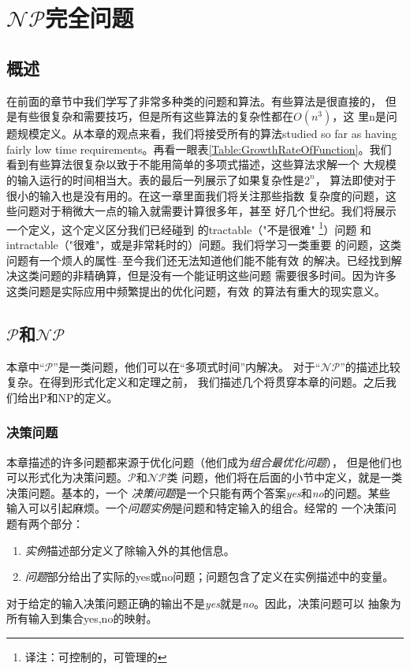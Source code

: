 \chapter{$\mathcal {NP}$完全问题}\label{Sec:Chapter:NPCompleteProblem}
\section{概述}
在前面的章节中我们学写了非常多种类的问题和算法。有些算法是很直接的，
但是有些很复杂和需要技巧，但是所有这些算法的复杂性都在$O(n^3)$，这
里n是问题规模定义。从本章的观点来看，我们将接受所有的算法studied so
far as having fairly low time
requirements。再看一眼表\ref{Table:GrowthRateOfFunction}。我们
看到有些算法很复杂以致于不能用简单的多项式描述，这些算法求解一个
大规模的输入运行的时间相当大。表的最后一列展示了如果复杂性是$2^n$，
算法即使对于很小的输入也是没有用的。在这一章里面我们将关注那些指数
复杂度的问题，这些问题对于稍微大一点的输入就需要计算很多年，甚至
好几个世纪。我们将展示一个定义，这个定义区分我们已经碰到
的tractable（"不是很难" \footnote{译注：可控制的，可管理的}）问题
和intractable（"很难"，或是非常耗时的）问题。我们将学习一类重要
的问题，这类问题有一个烦人的属性--至今我们还无法知道他们能不能有效
的解决。已经找到解决这类问题的非精确算，但是没有一个能证明这些问题
需要很多时间。因为许多这类问题是实际应用中频繁提出的优化问题，有效
的算法有重大的现实意义。

\section{$\mathcal {P}$和$\mathcal {NP}$}
本章中“$\mathcal {P}$”是一类问题，他们可以在“多项式时间”内解决。
对于“$\mathcal {NP}$”的描述比较复杂。在得到形式化定义和定理之前，
我们描述几个将贯穿本章的问题。之后我们给出P和NP的定义。
\subsection{决策问题}
本章描述的许多问题都来源于优化问题（他们成为\emph{组合最优化问题}），
但是他们也可以形式化为决策问题。$\mathcal {P}$和$\mathcal {NP}$类
问题，他们将在后面的小节中定义，就是一类决策问题。基本的，一个
\emph{决策问题}是一个只能有两个答案\emph{yes}和\emph{no}的问题。某些
输入可以引起麻烦。一个\emph{问题实例}是问题和特定输入的组合。经常的
一个决策问题有两个部分：
\begin{enumerate}
\item \emph{实例}描述部分定义了除输入外的其他信息。
\item \emph{问题}部分给出了实际的yes或no问题；问题包含了定义在实例描述中的变量。
\end{enumerate}
对于给定的输入决策问题正确的输出不是\emph{yes}就是\emph{no}。因此，决策问题可以
抽象为所有输入到集合{yes,no}的映射。

